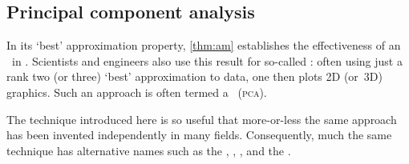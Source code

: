 \subsection{Principal component analysis}
\label{sec:pca}


In its `best' approximation property, \cref{thm:am} establishes the effectiveness of an \svd\ in .
Scientists and engineers also use this result for so-called : often using just a rank two (or three) `best' 
approximation to  data, one then plots 2D (or~3D) graphics.
Such an approach is often termed a ~(\textsc{pca}).

The technique introduced here is so useful that more-or-less the same 
approach has been invented independently in many fields. 
Consequently, much 
the same technique has alternative names such as the 
, , , and the .

